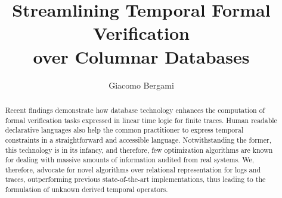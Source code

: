 \documentclass[sigconf]{acmart}
\begin{document}
\title[Streamlining Temporal Formal Verification over Columnar Databases]{Streamlining Temporal Formal Verification\\ over Columnar Databases}

\author{Giacomo Bergami}

\begin{abstract}
Recent findings demonstrate how database technology enhances the computation of formal verification tasks expressed in linear time logic for finite traces. Human readable declarative languages also help the common practitioner to express temporal constraints in a straightforward and accessible language. Notwithstanding the former, this technology is in its infancy, and therefore, few optimization algorithms are known for dealing with massive amounts of information audited from real systems. We, therefore, advocate for novel algorithms over relational representation for logs and traces, outperforming previous state-of-the-art implementations, thus leading to the formulation of unknown derived temporal operators.
\end{abstract}
\end{document}
